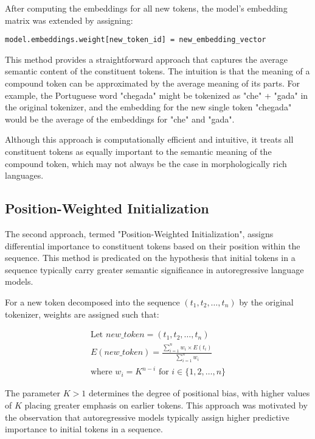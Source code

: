After computing the embeddings for all new tokens, the model's embedding matrix was extended by assigning:
\begin{verbatim}
model.embeddings.weight[new_token_id] = new_embedding_vector
\end{verbatim}

This method provides a straightforward approach that captures the average semantic content of the constituent tokens. The intuition is that the meaning of a compound token can be approximated by the average meaning of its parts. For example, the Portuguese word "chegada" might be tokenized as "che" + "gada" in the original tokenizer, and the embedding for the new single token "chegada" would be the average of the embeddings for "che" and "gada".

Although this approach is computationally efficient and intuitive, it treats all constituent tokens as equally important to the semantic meaning of the compound token, which may not always be the case in morphologically rich languages.


\subsection{Position-Weighted Initialization}
\label{subsec:pos-wei-init}

The second approach, termed "Position-Weighted Initialization", assigns differential importance to constituent tokens based on their position within the sequence. This method is predicated on the hypothesis that initial tokens in a sequence typically carry greater semantic significance in autoregressive language models.

For a new token decomposed into the sequence $(t_1, t_2, \ldots, t_n)$ by the original tokenizer, weights are assigned such that:



$$
\begin{array}{c}
    \text{Let } new\_token = (t_1, t_2, \ldots, t_n) \\
    E(new\_token) = \frac{\sum_{i=1}^{n} w_i \times E(t_i)}{\sum_{i=1}^{n} w_i} \\
    \text{where } w_i = K^{n-i} \text{ for } i \in \{1,2,\ldots,n\}
\end{array}
$$

The parameter $K > 1$ determines the degree of positional bias, with higher values of $K$ placing greater emphasis on earlier tokens. This approach was motivated by the observation that autoregressive models typically assign higher predictive importance to initial tokens in a sequence.

